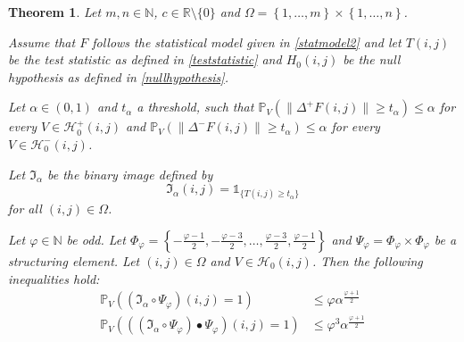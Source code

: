 \documentclass[a4paper,12pt]{article}
\newcommand{\norm}[1]{\lVert#1\rVert}
\theoremstyle{plain}
\newtheorem{theorem}{Theorem}[section]
\theoremstyle{definition}
\begin{document}
\begin{theorem}\label{thm: typeIinequalities}
	Let $m, n \in \mathbb{N}$, $c \in \mathbb{R} \setminus \{ 0 \}$ and $\Omega = \left\{ 1, \dots, m \right\} \times \left\{ 1, \dots, n \right\}$.
	
	Assume that $F$ follows the statistical model given in \eqref{statmodel2} and let $T(i, j)$ be the test statistic as defined in \eqref{teststatistic} and $H_0(i, j)$ be the null hypothesis as defined in \eqref{nullhypothesis}.
	
	Let $\alpha \in (0, 1)$ and $t_\alpha$ a threshold, such that $\mathbb{P}_V( \norm{\Delta^+ F(i, j)} \geq t_\alpha ) \leq \alpha$ for every $V \in \mathcal{H}_0^+(i, j)$ and $\mathbb{P}_V( \norm{\Delta^- F(i, j)} \geq t_\alpha ) \leq \alpha$ for every $V \in \mathcal{H}_0^-(i, j)$.
	
	Let $\mathfrak{I}_\alpha$ be the binary image defined by
	\begin{equation}
		\mathfrak{I}_\alpha(i, j) = \mathds{1}_{ \{ T(i, j) \geq t_\alpha \} }
	\end{equation}
	for all $(i, j) \in \Omega$.
	
	Let $\varphi \in \mathbb{N}$ be odd. Let $\Phi_\varphi = \left\{ -\frac{\varphi - 1}{2}, -\frac{\varphi - 3}{2}, \dots, \frac{\varphi - 3}{2}, \frac{\varphi - 1}{2} \right\}$ and $\Psi_\varphi = \Phi_\varphi \times \Phi_\varphi$ be a structuring element. Let $(i, j) \in \Omega$ and $V \in \mathcal{H}_0(i, j)$.
	Then the following inequalities hold:
	\begin{align}
		\mathbb{P}_V\left( (\mathfrak{I}_\alpha \circ \Psi_\varphi)(i, j) = 1 \right) &\leq \varphi \alpha^{\frac{\varphi + 1}{2}} \label{ineq: typeIopening} \\
		\mathbb{P}_V\left( ((\mathfrak{I}_\alpha \circ \Psi_\varphi) \bullet \Psi_\varphi)(i, j) = 1 \right) &\leq \varphi^3 \alpha^{\frac{\varphi + 1}{2}} \label{ineq: typeIclosing}
	\end{align}
\end{theorem}
\end{document}

